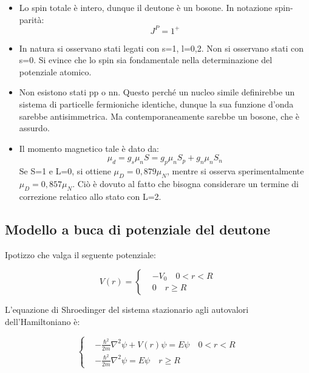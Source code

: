 \documentclass{article}
\begin{document}
\begin{itemize}
    \item Lo spin totale è intero, dunque il deutone è un bosone. In notazione spin-parità:
          \begin{equation}
              J^P=1^+
          \end{equation}
    \item In natura si osservano stati legati con s=1, l=0,2. Non si osservano stati con s=0. Si evince che lo spin sia fondamentale nella determinazione del potenziale atomico.
    \item Non esistono stati pp o nn. Questo perché un nucleo simile definirebbe un sistema di particelle fermioniche identiche, dunque la sua funzione d'onda sarebbe antisimmetrica. Ma contemporaneamente sarebbe un bosone, che è assurdo.
    \item Il momento magnetico tale è dato da:
          \begin{equation}
              \mu_d=g_s\mu_nS= g_p\mu_nS_p+g_n\mu_nS_n
          \end{equation}
          Se S=1 e L=0, si ottiene $\mu_D=0,879\mu_N$, mentre si osserva sperimentalmente $\mu_D=0,857\mu_N$.
          Ciò è dovuto al fatto che bisogna considerare un termine di correzione relatico allo stato con L=2.
\end{itemize}

\subsection{Modello a buca di potenziale del deutone}

Ipotizzo che valga il seguente potenziale:

\begin{equation}
    V(r)=
    \left\{
    \begin{aligned}
         & -V_0 \quad 0<r<R \\
         & 0 \quad r\geq R
    \end{aligned}
    \right.
\end{equation}

L'equazione di Shroedinger del sistema stazionario agli autovalori dell'Hamiltoniano è:

\begin{equation}
    \left\{
    \begin{aligned}
         & -\frac{\hbar^2}{2m}\nabla^2\psi+V(r)\psi=E\psi \quad 0<r<R \\
         & -\frac{\hbar^2}{2m}\nabla^2\psi=E\psi \quad r\geq R
    \end{aligned}
    \right.
\end{equation}
\end{document}

